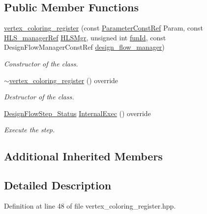 \subsection*{Public Member Functions}
\begin{DoxyCompactItemize}
\item 
\hyperlink{classvertex__coloring__register_a36703a7515462e2608596f8f0dc9d0d1}{vertex\+\_\+coloring\+\_\+register} (const \hyperlink{Parameter_8hpp_a37841774a6fcb479b597fdf8955eb4ea}{Parameter\+Const\+Ref} Param, const \hyperlink{hls__manager_8hpp_acd3842b8589fe52c08fc0b2fcc813bfe}{H\+L\+S\+\_\+manager\+Ref} \hyperlink{classHLS__step_ade85003a99d34134418451ddc46a18e9}{H\+L\+S\+Mgr}, unsigned int \hyperlink{classHLSFunctionStep_a3e6434fd86c698b0c70520b859bff5b0}{fun\+Id}, const Design\+Flow\+Manager\+Const\+Ref \hyperlink{classDesignFlowStep_ab770677ddf087613add30024e16a5554}{design\+\_\+flow\+\_\+manager})
\begin{DoxyCompactList}\small\item\em Constructor of the class. \end{DoxyCompactList}\item 
\hyperlink{classvertex__coloring__register_aa01f4afa797a1792c1b7389642cbfdfe}{$\sim$vertex\+\_\+coloring\+\_\+register} () override
\begin{DoxyCompactList}\small\item\em Destructor of the class. \end{DoxyCompactList}\item 
\hyperlink{design__flow__step_8hpp_afb1f0d73069c26076b8d31dbc8ebecdf}{Design\+Flow\+Step\+\_\+\+Status} \hyperlink{classvertex__coloring__register_ab7217f4137e671acf2dc41da060318b7}{Internal\+Exec} () override
\begin{DoxyCompactList}\small\item\em Execute the step. \end{DoxyCompactList}\end{DoxyCompactItemize}
\subsection*{Additional Inherited Members}


\subsection{Detailed Description}


Definition at line 48 of file vertex\+\_\+coloring\+\_\+register.\+hpp.



